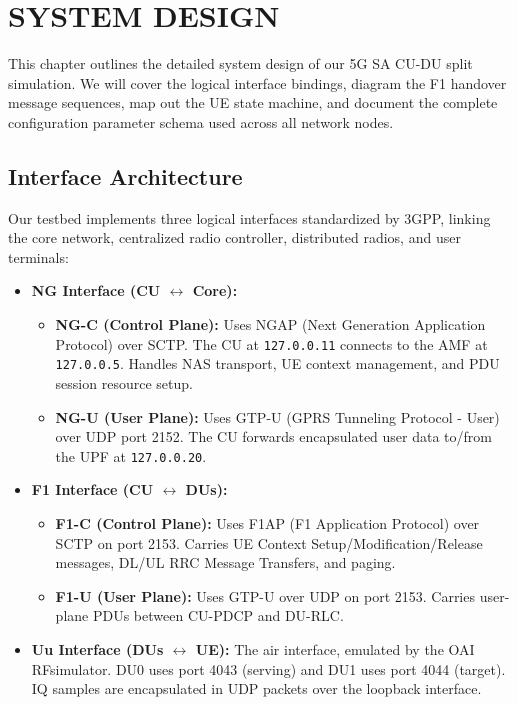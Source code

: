 \chapter{SYSTEM DESIGN}

\justify
This chapter outlines the detailed system design of our 5G SA CU-DU split simulation. We will cover the logical interface bindings, diagram the F1 handover message sequences, map out the UE state machine, and document the complete configuration parameter schema used across all network nodes.

\section{Interface Architecture}
\justify
Our testbed implements three logical interfaces standardized by 3GPP, linking the core network, centralized radio controller, distributed radios, and user terminals:
\begin{itemize}[leftmargin=*]
    \item \textbf{NG Interface (CU $\leftrightarrow$ Core):}
    \begin{itemize}
        \item \textbf{NG-C (Control Plane):} Uses NGAP (Next Generation Application Protocol) over SCTP. The CU at \texttt{127.0.0.11} connects to the AMF at \texttt{127.0.0.5}. Handles NAS transport, UE context management, and PDU session resource setup.
        \item \textbf{NG-U (User Plane):} Uses GTP-U (GPRS Tunneling Protocol - User) over UDP port 2152. The CU forwards encapsulated user data to/from the UPF at \texttt{127.0.0.20}.
    \end{itemize}
    
    \item \textbf{F1 Interface (CU $\leftrightarrow$ DUs):}
    \begin{itemize}
        \item \textbf{F1-C (Control Plane):} Uses F1AP (F1 Application Protocol) over SCTP on port 2153. Carries UE Context Setup/Modification/Release messages, DL/UL RRC Message Transfers, and paging.
        \item \textbf{F1-U (User Plane):} Uses GTP-U over UDP on port 2153. Carries user-plane PDUs between CU-PDCP and DU-RLC.
    \end{itemize}
    
    \item \textbf{Uu Interface (DUs $\leftrightarrow$ UE):} The air interface, emulated by the OAI RFsimulator. DU0 uses port 4043 (serving) and DU1 uses port 4044 (target). IQ samples are encapsulated in UDP packets over the loopback interface.
\end{itemize}

